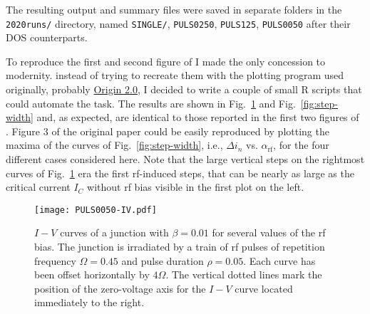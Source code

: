 The resulting output and summary files were saved in separate folders in the \texttt{2020runs/} directory, named \texttt{SINGLE/}, \texttt{PULS0250}, \texttt{PULS125}, \texttt{PULS0050} after their DOS counterparts.

To reproduce the first and second figure of \cite{Maggi:1996} I made the only concession to modernity. instead of trying to recreate them with the plotting program used originally, probably \href{https://www.originlab.com}{Origin 2.0}, I decided to write a couple of small R scripts that could automate the task.
The results are shown in Fig.~\ref{fig:pulsed-ivs} and Fig.~\ref{fig:step-width} and, as expected, are identical to those reported in the first two figures of \cite{Maggi:1996}. 
Figure 3 of the original paper could be easily reproduced by plotting the maxima of the curves of Fig.~\ref{fig:step-width}, i.e., $\Delta i_n$ vs. $\alpha_\mathrm{rf}$, for the four different cases considered here.
Note that the large vertical steps on the rightmost curves of Fig.~\ref{fig:pulsed-ivs} era the first rf-induced steps, that can be nearly as large as the critical current $I_C$ without rf bias visible in the first plot on the left.

\begin{figure}[t]
	\centering
	\texttt{[image: PULS0050-IV.pdf]}
	\caption{$I - V$ curves of a junction with $\beta = 0.01$ for several values of the rf bias. The junction is  irradiated by a train of rf pulses of repetition frequency $\Omega = 0.45$ and pulse duration $\rho = 0.05$. Each curve has been offset horizontally by $4 \Omega$. The vertical dotted lines mark the position of the zero-voltage axis for the $I - V$ curve located immediately to the right.}
	\label{fig:pulsed-ivs}
\end{figure}


